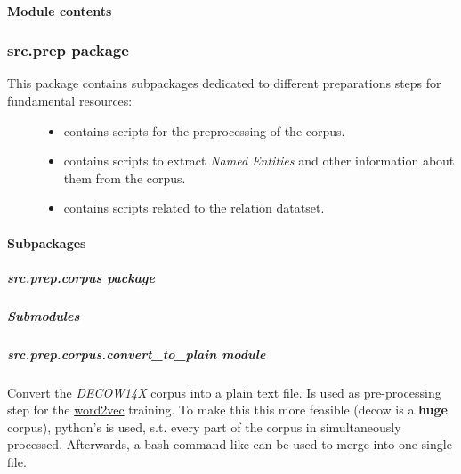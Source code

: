 \documentclass[letterpaper,10pt,english]{sphinxmanual}
\begin{document}
\paragraph{Module contents}
\label{src.misc:module-contents}\label{src.misc:module-src.misc}

\subsubsection{src.prep package}
\label{src.prep::doc}\label{src.prep:src-prep-package}\begin{description}
\item[{This package contains subpackages dedicated to different preparations steps for fundamental resources:}] \leavevmode\begin{itemize}
\item {} 
 contains scripts for the preprocessing of the  corpus.

\item {} 
 contains scripts to extract \emph{Named Entities} and other information about them from the corpus.

\item {} 
 contains scripts related to the  relation datatset.

\end{itemize}

\end{description}


\paragraph{Subpackages}
\label{src.prep:subpackages}

\subparagraph{src.prep.corpus package}
\label{src.prep.corpus::doc}\label{src.prep.corpus:src-prep-corpus-package}

\subparagraph{Submodules}
\label{src.prep.corpus:submodules}

\subparagraph{src.prep.corpus.convert\_to\_plain module}
\label{src.prep.corpus:src-prep-corpus-convert-to-plain-module}\label{src.prep.corpus:module-src.prep.corpus.convert_to_plain}
Convert the \emph{DECOW14X} corpus into a plain text file. Is used as pre-processing step for the
\href{https://code.google.com/archive/p/word2vec/}{word2vec} training.
To make this this more feasible (decow is a \textbf{huge} corpus), python's  is used, s.t. every
part of the corpus in simultaneously processed. Afterwards, a bash command like  can be used to merge into one
single file.
\end{document}
